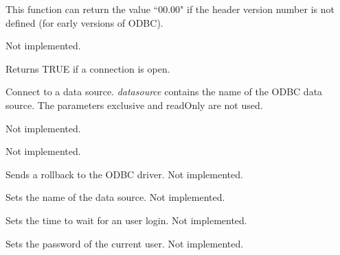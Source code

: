 This function can return the value ``00.00" if the header version number is not defined (for early
versions of ODBC).



Not implemented.



Returns TRUE if a connection is open.

\label{wxdatabaseopen}


Connect to a data source. {\it datasource} contains the name of the ODBC data
source. The parameters exclusive and readOnly are not used.



Not implemented.  
  


Not implemented.



Sends a rollback to the ODBC driver. Not implemented.



Sets the name of the data source. Not implemented.
  


Sets the time to wait for an user login. Not implemented.
  


Sets the password of the current user. Not implemented.

